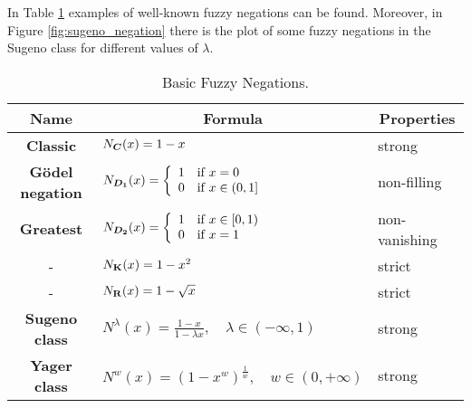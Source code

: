 In Table \ref{table:fuzzy_negations} examples of well-known fuzzy negations can be found. Moreover, in Figure \ref{fig:sugeno_negation} there is the plot of some fuzzy negations in the Sugeno class for different values of $\lambda$.
\begin{table}[ht!]
	\setlength\tabcolsep{5pt}
	\renewcommand{\arraystretch}{1.5}
	\centering
	\begin{tabular}{|c|l|l|} \hline
		\bf Name & \multicolumn{1}{|c|}{\bf Formula} & \multicolumn{1}{|c|}{\bf Properties} \\[2pt]  
		\hline \bf Classic & $N_{\bm{C}}(x)=1-x$ & strong \\[2pt] 
		\hline \bf G\"odel negation  & $N_{\bm{D_1}}(x)=\left\{\begin{array}{ll}1&\hbox{if } x=0\\0&\hbox{if } x\in(0,1]\end{array}\right.$ & non-filling\\[2pt] 
		\hline \bf Greatest & $N_{\bm{D_2}}(x)=\left\{\begin{array}{ll}1&\hbox{if } x\in[0,1)\\0&\hbox{if } x=1\end{array}\right.$ & non-vanishing  \\[2pt] 
		\hline - & $N_{\bf K}(x)=1-x^2$ & strict  \\[2pt] 
		\hline - & $N_{\bf R}(x)=1-\sqrt{x}$ & strict  \\[2pt] 
		\hline \bf Sugeno class & $N^{\lambda}(x)=\frac{1-x}{1-\lambda x}, \quad \lambda \in (-\infty,1)$ & strong  \\[2pt] 
		\hline \bf Yager class & $N^{w}(x)=(1-x^w)^{\frac{1}{w}}, \quad w \in (0,+\infty)$ & strong  \\
		\hline
	\end{tabular}
	\caption{Basic Fuzzy Negations.}\label{table:fuzzy_negations}
\end{table}

